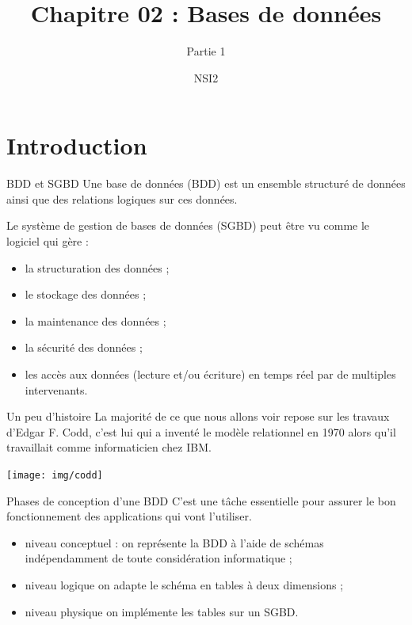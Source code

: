 \documentclass[10pt]{nsibeamer}
\title{Chapitre 02 : Bases de données}
\subtitle{Partie 1}
\author{NSI2}
\begin{document}
	\maketitle
    \section{Introduction}
\begin{frame}{BDD et SGBD}
	Une \alert{base de données} (BDD) est un ensemble structuré de données ainsi que des relations logiques sur ces données.\\\pause

    Le \alert{système de gestion de bases de données} (SGBD) peut être vu comme le logiciel qui gère :\pause
    \begin{itemize}
    	\item	la structuration des données ;\pause
    	\item	le stockage des données ;\pause
        \item 	la maintenance des données ;\pause
        \item 	la sécurité des données ;\pause
        \item 	les accès aux données (lecture et/ou écriture) en temps réel par de multiples intervenants.
    \end{itemize}
\end{frame}

\begin{frame}{Un peu d'histoire}
	La majorité de ce que nous allons voir repose sur les travaux d'Edgar F. Codd, c'est lui qui a inventé le modèle relationnel en 1970 alors qu'il travaillait comme informaticien chez IBM.
    \begin{center}
        \texttt{[image: img/codd]}
    \end{center}
\end{frame}

\begin{frame}{Phases de conception d'une BDD}
	C'est une tâche essentielle pour assurer le bon fonctionnement des applications qui vont l'utiliser.\pause
    \begin{itemize}
    	\item	\alert{niveau conceptuel} : on représente la BDD à l'aide de schémas indépendamment de toute considération informatique ;\pause
    	\item	\alert{niveau logique} on adapte le schéma en tables à deux dimensions ;\pause
        \item	\alert{niveau physique} on implémente les tables sur un SGBD.
    \end{itemize}
\end{frame}
\end{document}
